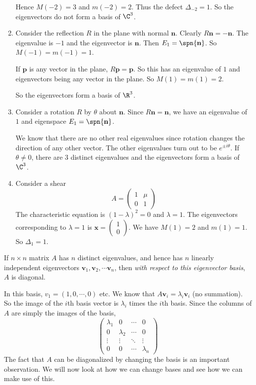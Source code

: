 \documentclass[a4paper]{article}
\begin{document}
\begin{eg}
\begin{enumerate}
      Hence $M(-2) = 3$ and $m(-2) = 2$. Thus the defect $\Delta_{-2} = 1$. So the eigenvectors do not form a basis of $\C^3$.
    \item Consider the reflection $R$ in the plane with normal $\mathbf{n}$. Clearly $R\mathbf{n} = -\mathbf{n}$. The eigenvalue is $-1$ and the eigenvector is $\mathbf{n}$. Then $E_1 = \spn\{\mathbf{n}\}$. So $M(-1) = m(-1) = 1$.

      If $\mathbf{p}$ is any vector in the plane, $R\mathbf{p} = \mathbf{p}$. So this has an eigenvalue of $1$ and eigenvectors being any vector in the plane. So $M(1) = m(1) = 2$.

      So the eigenvectors form a basis of $\R^3$.
    \item Consider a rotation $R$ by $\theta$ about $\mathbf{n}$. Since $R\mathbf{n} = \mathbf{n}$, we have an eigenvalue of $1$ and eigenspace $E_1 = \spn\{\mathbf{n}\}$.

      We know that there are no other real eigenvalues since rotation changes the direction of any other vector. The other eigenvalues turn out to be $e^{\pm i\theta}$. If $\theta \not= 0$, there are 3 distinct eigenvalues and the eigenvectors form a basis of $\C^3$.
    \item Consider a shear
      \[
        A =
        \begin{pmatrix}
          1&\mu\\0&1
        \end{pmatrix}
      \]
      The characteristic equation is $(1 - \lambda)^2 = 0$ and $\lambda = 1$. The eigenvectors corresponding to $\lambda = 1$ is $\mathbf{x} =
      \begin{pmatrix}
        1\\0
      \end{pmatrix}$. We have $M(1) = 2$ and $m(1) = 1$. So $\Delta_1 = 1$.
  \end{enumerate}
\end{eg}
If $n\times n$ matrix $A$ has $n$ distinct eigenvalues, and hence has $n$ linearly independent eigenvectors $\mathbf{v}_1, \mathbf{v}_2, \cdots \mathbf{v}_n$, then \emph{with respect to this eigenvector basis}, $A$ is diagonal.

In this basis, $v_1 = (1, 0, \cdots, 0)$ etc. We know that $A\mathbf{v}_i = \lambda_i\mathbf{v}_i$ (no summation). So the image of the $i$th basis vector is $\lambda_i$ times the $i$th basis. Since the columns of $A$ are simply the images of the basis,
\[
  \begin{pmatrix}
    \lambda_1 & 0 & \cdots & 0\\
    0 & \lambda_2 & \cdots & 0\\
    \vdots & \vdots & \ddots & \vdots\\
    0 & 0 & \cdots & \lambda_n
  \end{pmatrix}
\]
The fact that $A$ can be diagonalized by changing the basis is an important observation. We will now look at how we can change bases and see how we can make use of this.
\end{document}
